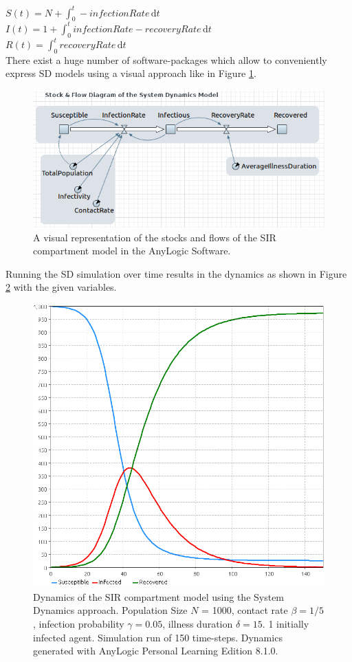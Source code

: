 $S(t) = N + \int_0^t -infectionRate\, \mathrm{d}t$ \\
$I(t) = 1 + \int_0^t infectionRate - recoveryRate\, \mathrm{d}t$ \\
$R(t) = \int_0^t recoveryRate\, \mathrm{d}t$ \\

There exist a huge number of software-packages which allow to conveniently express SD models using a visual approach like in Figure \ref{fig:sir_sd_stockflow_diagramm}.

\begin{figure}
	\centering
	\includegraphics[width=.4\textwidth, angle=0]{./fig/SIR_SD_STOCKFLOW_DIAGRAMM.png}
	\caption{A visual representation of the stocks and flows of the SIR compartment model in the AnyLogic Software.}
	\label{fig:sir_sd_stockflow_diagramm}
\end{figure}

Running the SD simulation over time results in the dynamics as shown in Figure \ref{fig:sir_sd_dynamics_anylogic} with the given variables.

\begin{figure}
	\centering
	\includegraphics[width=.4\textwidth, angle=0]{./fig/SIR_SD_DYNAMICS_ANYLOGIC.png}
	\caption{Dynamics of the SIR compartment model using the System Dynamics approach. Population Size $N$ = 1000, contact rate $\beta = 1/5$, infection probability $\gamma = 0.05$, illness duration $\delta = 15$. 1 initially infected agent. Simulation run of 150 time-steps. Dynamics generated with AnyLogic Personal Learning Edition 8.1.0.}
	\label{fig:sir_sd_dynamics_anylogic}
\end{figure}


